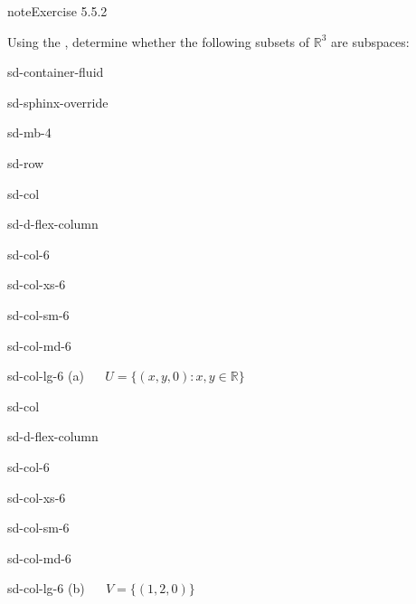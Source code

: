 \documentclass[letterpaper,10pt,english]{jupyterBook}
\begin{document}
\begin{sphinxadmonition}{note}{Exercise 5.5.2}



\sphinxAtStartPar
Using the {\hyperref[\detokenize{_pages/5.2_Subspaces:subspace-condition-theorem}]{}}, determine whether the following subsets of \(\mathbb{R}^3\) are subspaces:

\begin{sphinxuseclass}{sd-container-fluid}
\begin{sphinxuseclass}{sd-sphinx-override}
\begin{sphinxuseclass}{sd-mb-4}
\begin{sphinxuseclass}{sd-row}
\begin{sphinxuseclass}{sd-col}
\begin{sphinxuseclass}{sd-d-flex-column}
\begin{sphinxuseclass}{sd-col-6}
\begin{sphinxuseclass}{sd-col-xs-6}
\begin{sphinxuseclass}{sd-col-sm-6}
\begin{sphinxuseclass}{sd-col-md-6}
\begin{sphinxuseclass}{sd-col-lg-6}
\sphinxAtStartPar
(a)   \(U = \{ (x, y, 0) : x, y \in \mathbb{R} \}\)

\end{sphinxuseclass}
\end{sphinxuseclass}
\end{sphinxuseclass}
\end{sphinxuseclass}
\end{sphinxuseclass}
\end{sphinxuseclass}
\end{sphinxuseclass}
\begin{sphinxuseclass}{sd-col}
\begin{sphinxuseclass}{sd-d-flex-column}
\begin{sphinxuseclass}{sd-col-6}
\begin{sphinxuseclass}{sd-col-xs-6}
\begin{sphinxuseclass}{sd-col-sm-6}
\begin{sphinxuseclass}{sd-col-md-6}
\begin{sphinxuseclass}{sd-col-lg-6}
\sphinxAtStartPar
(b)   \(V = \{ (1, 2, 0) \}\)


\end{sphinxuseclass}
\end{sphinxuseclass}
\end{sphinxuseclass}
\end{sphinxuseclass}
\end{sphinxuseclass}
\end{sphinxuseclass}
\end{sphinxuseclass}
\end{sphinxuseclass}
\end{sphinxuseclass}
\end{sphinxuseclass}
\end{sphinxuseclass}
\end{sphinxadmonition}
\end{document}
